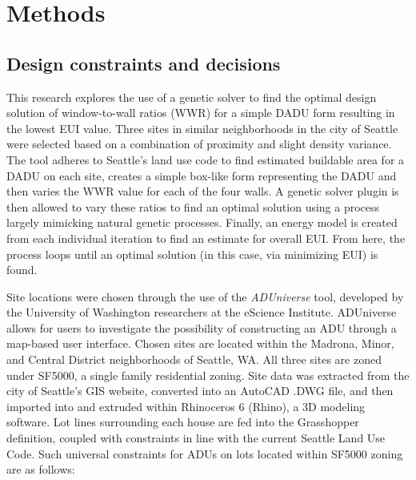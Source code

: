\documentclass[sagev,times,Royal]{sagej}
\begin{document}
\section{Methods} 
\subsection{Design constraints and decisions}
This research explores the use of a genetic solver to find the optimal design solution of window-to-wall ratios (WWR) for a simple DADU form resulting in the lowest EUI value. Three sites in similar neighborhoods in the city of Seattle were selected based on a combination of proximity and slight density variance. The tool adheres to Seattle's land use code to find estimated buildable area for a DADU on each site, creates a simple box-like form representing the DADU and then varies the WWR value for each of the four walls. A genetic solver plugin is then allowed to vary these ratios to find an optimal solution using a process largely mimicking natural genetic processes. Finally, an energy model is created from each individual iteration to find an estimate for overall EUI. From here, the process loops until an optimal solution (in this case, via minimizing EUI) is found.

Site locations were chosen through the use of the \textit{ADUniverse} tool, developed by the University of Washington researchers at the eScience Institute\cite{ADUniverseToolEScience}. ADUniverse allows for users to investigate the possibility of constructing an ADU through a map-based user interface. Chosen sites are located within the Madrona, Minor, and Central District neighborhoods of Seattle, WA. All three sites are zoned under SF5000, a single family residential zoning. Site data was extracted from the city of Seattle's GIS website, converted into an AutoCAD .DWG file, and then imported into and extruded within Rhinoceros 6 (Rhino), a 3D modeling software. Lot lines surrounding each house are fed into the Grasshopper definition, coupled with constraints in line with the current Seattle Land Use Code. Such universal constraints for ADUs on lots located within SF5000 zoning are as follows\cite{ADURules}: 
\end{document}
